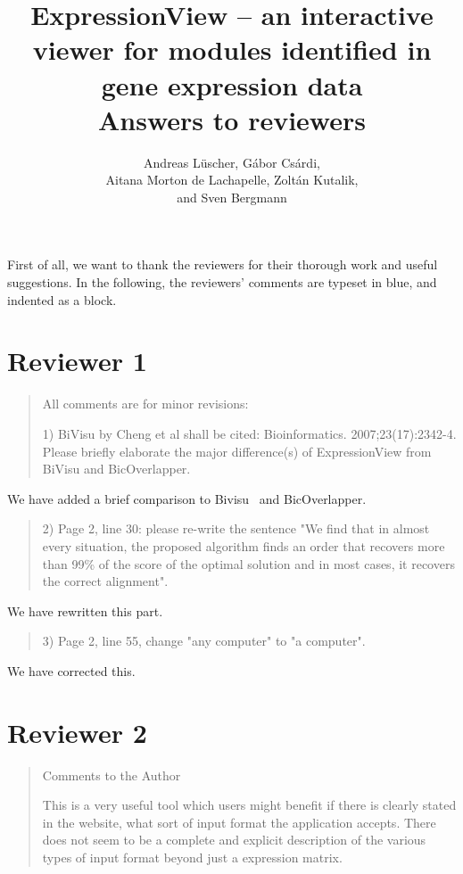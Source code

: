 \documentclass[a4paper]{article}
\title{ExpressionView -- an interactive viewer for
  modules identified in gene expression data\\[10pt]
  Answers to reviewers}
\author{Andreas L\"uscher, G\'abor Cs\'ardi, \\ Aitana Morton de
  Lachapelle, Zolt\'an Kutalik, \\ and Sven Bergmann}
\newenvironment{myquote}{\begin{quote}\color{blue}}{\end{quote}}
\begin{document}
\maketitle

\RaggedRight

First of all, we want to thank the reviewers for their thorough work
and useful suggestions. In the following, the reviewers' comments are
typeset in blue, and indented as a block.

\section*{Reviewer 1}

\begin{myquote}
All comments are for minor revisions:

1) BiVisu by Cheng et al shall be cited:
Bioinformatics. 2007;23(17):2342-4. Please briefly elaborate the major
difference(s) of ExpressionView from BiVisu and BicOverlapper.
\end{myquote}

We have added a brief comparison to Bivisu~\citep{cheng07} and
BicOverlapper\citep{santamaria08}. 

\begin{myquote}
2) Page 2, line 30: please re-write the sentence "We find that in
almost every situation, the proposed algorithm finds an order that
recovers more than 99\% of the score of the optimal solution and in
most cases, it recovers the correct alignment". 
\end{myquote}

We have rewritten this part.

\begin{myquote}
3) Page 2, line 55, change "any computer" to "a computer".
\end{myquote}

We have corrected this.

\section*{Reviewer 2}

\begin{myquote}
Comments to the Author

This is a very useful tool which users might  benefit if there is
clearly stated in the website, what sort of input format the
application accepts. There does not seem to be a complete and explicit
description of the various types of input format beyond just a
expression matrix.
\end{myquote}
\end{document}
